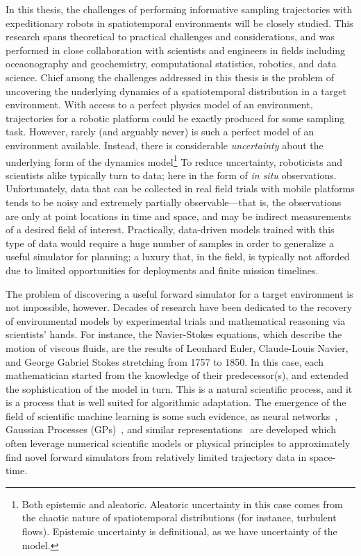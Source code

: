 In this thesis, the challenges of performing informative sampling trajectories with expeditionary robots in spatiotemporal environments will be closely studied. 
This research spans theoretical to practical challenges and considerations, and was performed in close collaboration with scientists and engineers in fields including oceaonography and geochemistry, computational statistics, robotics, and data science.
Chief among the challenges addressed in this thesis is the problem of uncovering the underlying dynamics of a spatiotemporal distribution in a target environment.
With access to a perfect physics model of an environment, trajectories for a robotic platform could be exactly produced for some sampling task.
However, rarely (and arguably never) is such a perfect model of an environment available.
Instead, there is considerable \emph{uncertainty} about the underlying form of the dynamics model\footnote{Both epistemic and aleatoric. Aleatoric uncertainty in this case comes from the chaotic nature of spatiotemporal distributions (for instance, turbulent flows). Epistemic uncertainty is definitional, as we have uncertainty of the model.}
To reduce uncertainty, roboticists and scientists alike typically turn to data; here in the form of \emph{in situ} observations.
Unfortunately, data that can be collected in real field trials with mobile platforms tends to be noisy and extremely partially observable---that is, the observations are only at point locations in time and space, and may be indirect measurements of a desired field of interest. 
Practically, data-driven models trained with this type of data would require a huge number of samples in order to generalize a useful simulator for planning; a luxury that, in the field, is typically not afforded due to limited opportunities for deployments and finite mission timelines.

The problem of discovering a useful forward simulator for a target environment is not impossible, however.
Decades of research have been dedicated to the recovery of environmental models by experimental trials and mathematical reasoning via scientists' hands.
For instance, the Navier-Stokes equations, which describe the motion of viscous fluids, are the results of Leonhard Euler, Claude-Louis Navier, and George Gabriel Stokes stretching from 1757 to 1850. 
In this case, each mathematician started from the knowledge of their predecessor(s), and extended the sophistication of the model in turn.
This is a natural scientific process, and it is a process that is well suited for algorithmic adaptation.
The emergence of the field of scientific machine learning is some such evidence, as neural networks~\autocite{raissi2019physics, sapsis2009dynamically, mohan2019compressed}, Gaussian Processes (GPs)~\autocite{raissi2018numerical}, and similar representations~\autocite{kulkarni2019advection, brunton2016discovering} are developed which often leverage numerical scientific models or physical principles to approximately find novel forward simulators from relatively limited trajectory data in space-time.

